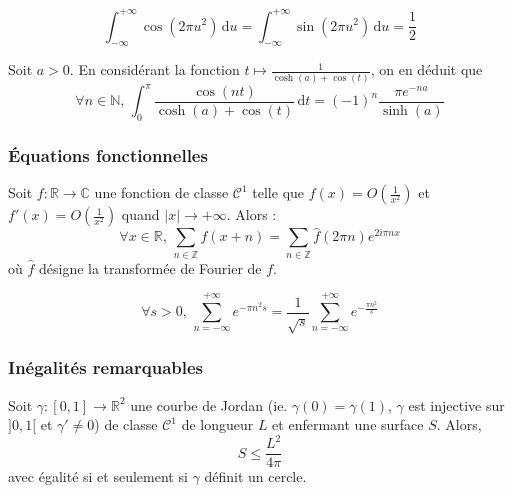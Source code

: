 	\begin{application}
		\[ \int_{-\infty}^{+\infty} \cos(2 \pi u^2) \, \mathrm{d}u = \int_{-\infty}^{+\infty} \sin(2 \pi u^2) \, \mathrm{d}u = \frac{1}{2} \]
	\end{application}


	\begin{application}
		Soit $a > 0$. En considérant la fonction $t \mapsto \frac{1}{\cosh(a) + \cos(t)}$, on en déduit que
		\[ \forall n \in \mathbb{N}, \, \int_{0}^{\pi} \frac{\cos(nt)}{\cosh(a) + \cos(t)} \, \mathrm{d}t = (-1)^n \frac{\pi e^{-na}}{\sinh(a)} \]
	\end{application}

	\subsubsection{Équations fonctionnelles}


	\begin{theorem}
		\label{formule-sommatoire-de-poisson-1}
		Soit $f : \mathbb{R} \rightarrow \mathbb{C}$ une fonction de classe $\mathcal{C}^1$ telle que $f(x) = O \left( \frac{1}{x^2} \right)$ et $f'(x) = O \left( \frac{1}{x^2} \right)$ quand $|x| \longrightarrow +\infty$. Alors :
		\[ \forall x \in \mathbb{R}, \, \sum_{n \in \mathbb{Z}} f(x+n) = \sum_{n \in \mathbb{Z}} \widehat{f}(2 \pi n) e^{2 i \pi n x} \]
		où $\widehat{f}$ désigne la transformée de Fourier de $f$.
	\end{theorem}

	\begin{application}
		\[ \forall s > 0, \, \sum_{n=-\infty}^{+\infty} e^{-\pi n^2 s} = \frac{1}{\sqrt{s}} \sum_{n=-\infty}^{+\infty} e^{-\frac{\pi n^2}{s}} \]
	\end{application}

	\subsubsection{Inégalités remarquables}


	\begin{application}
		Soit $\gamma : [0,1] \rightarrow \mathbb{R}^2$ une courbe de Jordan (ie. $\gamma(0) = \gamma(1)$, $\gamma$ est injective sur $]0,1[$ et $\gamma' \neq 0$) de classe $\mathcal{C}^1$ de longueur $L$ et enfermant une surface $S$. Alors,
		\[ S \leq \frac{L^2}{4 \pi} \]
		avec égalité si et seulement si $\gamma$ définit un cercle.
	\end{application}

